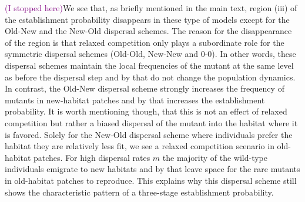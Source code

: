 \documentclass[11pt]{article}
\newcommand{\florence}[1]{\textcolor{purple}{(#1)}} %
\begin{document}
\florence{I stopped here}We see that, as briefly mentioned in the main text, region (iii) of the establishment probability disappears in these type of models except for the Old-New and the New-Old dispersal schemes. The reason for the disappearance of the region is that relaxed competition only plays a subordinate role for the symmetric dispersal schemes (Old-Old, New-New and 0-0). In other words, these dispersal schemes maintain the local frequencies of the mutant at the same level as before the dispersal step and by that do not change the population dynamics. In contrast, the Old-New dispersal scheme strongly increases the frequency of mutants in new-habitat patches and by that increases the establishment probability. It is worth mentioning though, that this is not an effect of relaxed competition but rather a biased dispersal of the mutant into the habitat where it is favored. Solely for the New-Old dispersal scheme where individuals prefer the habitat they are relatively less fit, we see a relaxed competition scenario in old-habitat patches. For high dispersal rates $m$ the majority of the wild-type individuals emigrate to new habitats and by that leave space for the rare mutants in old-habitat patches to reproduce. This explains why this dispersal scheme still shows the characteristic pattern of a three-stage establishment probability.   \newpage 
\end{document}
